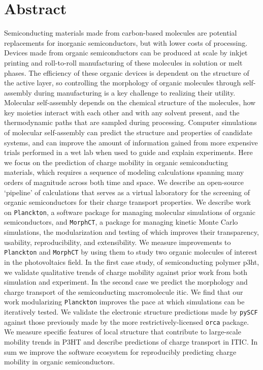 
\chapter*{Abstract}

Semiconducting materials made from carbon-based molecules are potential replacements for inorganic semiconductors, but with lower costs of processing.
Devices made from organic semiconductors can be produced at scale by inkjet printing and roll-to-roll manufacturing of these molecules in solution or melt phases.  
The efficiency of these organic devices is dependent on the structure of the active layer, so controlling the morphology of organic molecules through self-assembly during manufacturing is a key challenge to realizing their utility.
Molecular self-assembly depends on the chemical structure of the molecules, how key moieties interact with each other and with any solvent present, and the thermodynamic paths that are sampled during processing.
Computer simulations of molecular self-assembly can predict the structure and properties of candidate systems, and can improve the amount of information gained from more expensive trials performed in a wet lab when used to guide and explain experiments.
Here we focus on the prediction of charge mobility in organic semiconducting materials,
which requires a sequence of modeling calculations spanning many orders of magnitude across both time and space.
We describe an open-source `pipeline' of calculations that serves as a virtual laboratory for the screening of organic semiconductors for their charge transport properties.
We describe work on \texttt{Planckton}, a software package for managing molecular simulations of organic semiconductors, and \texttt{MorphCT},
a package for managing kinetic Monte Carlo simulations, the modularization and testing of which improves their transparency, usability, reproducibility, and extensibility.
We measure improvements to \texttt{Planckton} and \texttt{MorphCT} by using them to study two organic molecules of interest in the photovoltaics field.
In the first case study, of semiconducting polymer \gls{p3ht}, 
we validate qualitative trends of charge mobility against prior work from both simulation and experiment.
In the second case we predict the morphology and charge transport of the semiconducting macromolecule 
\gls{itic}.
We find that our work modularizing \texttt{Planckton} improves the pace at which simulations can be iteratively tested.
We validate the electronic structure predictions made by \texttt{pySCF} against those previously made by the more restrictively-licensed \texttt{orca} package.
We measure specific features of local structure that contribute to large-scale mobility trends in P3HT and describe predictions of charge transport in ITIC.
In sum we improve the software ecosystem for reproducibly predicting charge mobility in organic semiconductors.

